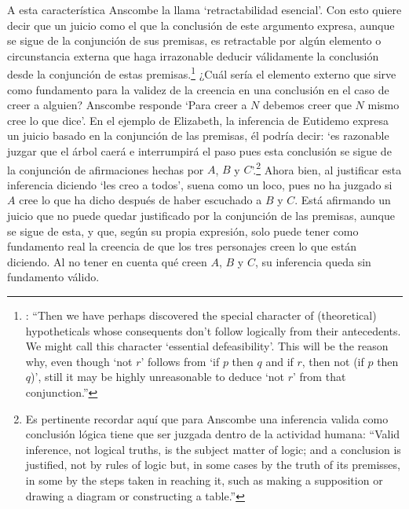 A esta característica Anscombe la llama `retractabilidad esencial'. Con esto quiere decir que un juicio como el que la conclusión de este argumento expresa, aunque se sigue de la conjunción de sus premisas, es retractable por algún elemento o circunstancia externa que haga irrazonable deducir válidamente la conclusión desde la conjunción de estas premisas.\footnote{\cite[Cf.~][299]{anscombe2015logic:qpa}: \enquote{Then we have perhaps discovered the special character of (theoretical) hypotheticals whose consequents don't follow logically from their antecedents. We might call this character `essential defeasibility'. This will be the reason why, even though `not $r$' follows from `if $p$ then $q$ and if $r$, then not (if $p$ then $q$)', still it may be highly unreasonable to deduce `not $r$' from that conjunction.}} ¿Cuál sería el elemento externo que sirve como fundamento para la validez de la creencia en una conclusión en el caso de creer a alguien? Anscombe responde \enquote*{Para creer a $N$ debemos creer que $N$ mismo cree lo que dice}. En el ejemplo de Elizabeth, la inferencia de Eutidemo expresa un juicio basado en la conjunción de las premisas, él podría decir: \enquote*{es razonable juzgar que el árbol caerá e interrumpirá el paso pues esta conclusión se sigue de la conjunción de afirmaciones hechas por $A$, $B$ y $C$}.\footnote{Es pertinente recordar aquí que para Anscombe una inferencia valida como conclusión lógica tiene que ser juzgada dentro de la actividad humana: \cite[121]{anscombe1981parmenides:qli} \enquote{Valid inference, not logical truths, is the subject matter of logic; and a conclusion is justified, not by rules of logic but, in some cases by the truth of its premisses, in some by the steps taken in reaching it, such as making a supposition or drawing a diagram or constructing a table.}} Ahora bien, al justificar esta inferencia diciendo \enquote*{les creo a todos}, suena como un loco, pues no ha juzgado si $A$ cree lo que ha dicho después de haber escuchado a $B$ y $C$. Está afirmando un juicio que no puede quedar justificado por la conjunción de las premisas, aunque se sigue de esta, y que, según su propia expresión, solo puede tener como fundamento real la creencia de que los tres personajes creen lo que están diciendo. Al no tener en cuenta qué creen $A$, $B$ y $C$, su inferencia queda sin fundamento válido.


